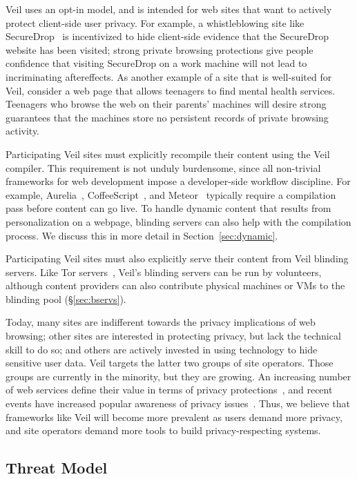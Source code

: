 Veil uses an opt-in model, and is intended
for web sites that want to actively protect
client-side user privacy. For example, a
whistleblowing site like SecureDrop~\cite{secureDrop}
is incentivized to hide client-side evidence
that the SecureDrop website has been visited;
strong private browsing protections give people
confidence that visiting SecureDrop on a work
machine will not lead to incriminating aftereffects.
As another example of a site that is well-suited
for Veil, consider a web page that allows
teenagers to find mental health services. Teenagers
who browse the web on their parents' machines 
will desire strong guarantees that the
machines store no persistent records of private
browsing activity.

Participating Veil sites must explicitly recompile
their content using the Veil compiler. This
requirement is not unduly burdensome, since
all non-trivial frameworks for web development impose
a developer-side workflow discipline. For example,
Aurelia~\cite{aurelia}, CoffeeScript~\cite{coffeeScript}, and
Meteor~\cite{meteor} typically require a
compilation pass before content can go live.
To handle dynamic content that results from 
personalization on a webpage, blinding servers
can also help with the compilation process. We
discuss this in more detail in Section~\ref{sec:dynamic}.

Participating Veil sites must also explicitly serve
their content from Veil blinding servers. Like
Tor servers~\cite{tor}, Veil's blinding servers
can be run by volunteers, although content providers
can also contribute physical machines or VMs to
the blinding pool (\S\ref{sec:bservs}).

Today, many sites are indifferent
towards the privacy implications of web browsing;
other sites are interested in protecting privacy,
but lack the technical skill to do so; and others
are actively invested in using technology to hide
sensitive user data. Veil targets the latter
two groups of site operators. Those groups are
currently in the minority, but they are growing.
An increasing number of web services define their
value in terms of privacy protections~\cite{duckduck,enigma,privio,privly},
and recent events have increased popular
awareness of privacy issues~\cite{torAfterSnowden}.
Thus, we believe that frameworks like Veil will
become more prevalent as users demand more
privacy, and site operators demand more tools to
build privacy-respecting systems.

\subsection{Threat Model}
\label{sec:threatModel}

